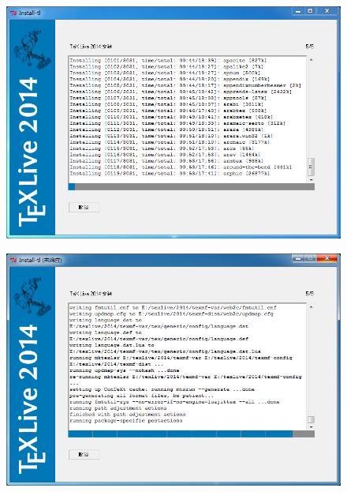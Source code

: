 \documentclass[xcolor=table,dvipsnames,svgnames]{beamer}
\begin{document}
\begin{frame}
  \begin{figure}[h]
  \centering
  \includegraphics[scale=0.5]{simple7-installing.png}
  \end{figure}
\end{frame}

\begin{frame}
  \begin{figure}[h]
  \centering
  \includegraphics[scale=0.5]{simple8-postinstall.png}
  \end{figure}
\end{frame}
\end{document}

